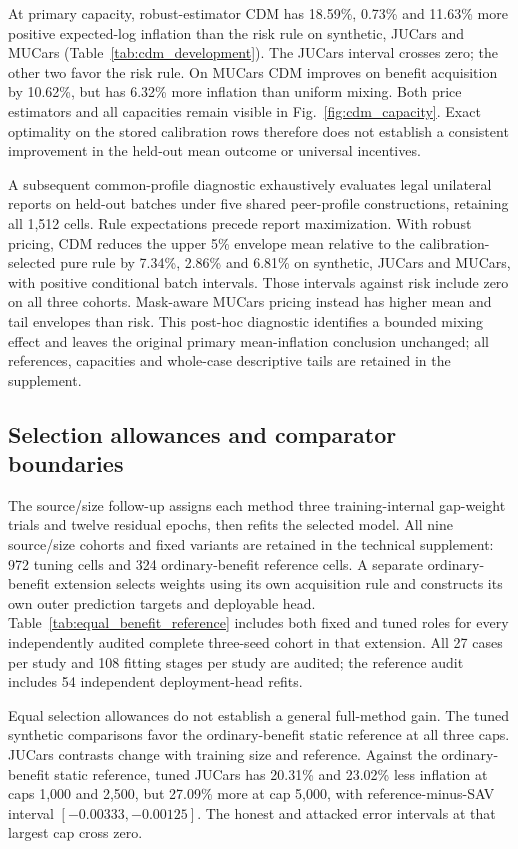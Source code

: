 \documentclass[pdflatex,sn-nature]{sn-jnl}
\begin{document}
At primary capacity, robust-estimator CDM has 18.59\%, 0.73\% and 11.63\%
more positive expected-log inflation than the risk rule on synthetic, JUCars
and MUCars (Table~\ref{tab:cdm_development}). The JUCars interval crosses zero;
the other two favor the risk rule. On MUCars CDM improves on benefit acquisition
by 10.62\%, but has 6.32\% more inflation than uniform mixing. Both price
estimators and all capacities remain visible in Fig.~\ref{fig:cdm_capacity}.
Exact optimality on the stored calibration rows therefore does not establish
a consistent improvement in the held-out mean outcome or universal incentives.

A subsequent common-profile diagnostic exhaustively evaluates legal
unilateral reports on held-out batches under five shared peer-profile
constructions, retaining all 1,512 cells. Rule expectations precede report
maximization. With robust pricing, CDM reduces the upper 5\% envelope mean
relative to the calibration-selected pure rule by 7.34\%, 2.86\% and 6.81\%
on synthetic, JUCars and MUCars, with positive conditional batch intervals.
Those intervals against risk include zero on all three cohorts. Mask-aware
MUCars pricing instead has higher mean and tail envelopes than risk.
This post-hoc diagnostic identifies a bounded mixing effect and leaves the
original primary mean-inflation conclusion unchanged; all references,
capacities and whole-case descriptive tails are retained in the supplement.

\subsection{Selection allowances and comparator boundaries}
The source/size follow-up assigns each method three training-internal
gap-weight trials and twelve residual epochs, then refits the selected model.
All nine source/size cohorts and fixed variants are retained in the
technical supplement: 972 tuning cells and 324 ordinary-benefit reference cells. A separate ordinary-benefit extension selects weights using its
own acquisition rule and constructs its own outer prediction targets and
deployable head. Table~\ref{tab:equal_benefit_reference} includes both fixed and
tuned roles for every independently audited complete three-seed cohort in that
extension. All 27 cases per study and 108 fitting stages per study are audited;
the reference audit includes 54 independent deployment-head refits.

Equal selection allowances do not establish a general full-method gain.
The tuned synthetic comparisons favor the ordinary-benefit static reference
at all three caps. JUCars contrasts change with training size and reference.
Against the ordinary-benefit static reference, tuned JUCars has 20.31\%
and 23.02\% less inflation at caps 1,000 and 2,500, but 27.09\% more
at cap 5,000, with reference-minus-SAV interval $[-0.00333,-0.00125]$.
The honest and attacked error intervals at that largest cap cross zero.
\end{document}
